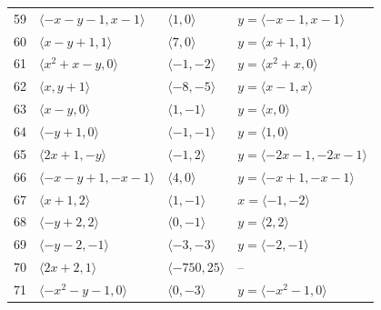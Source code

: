 \documentclass[11pt]{article}
\begin{document}
\begin{longtable}{@{}rlll@{}}
59 & $\langle -x-y-1,x-1\rangle$ & $\langle 1,0\rangle$ & $y=\langle -x-1,x-1\rangle$\\
60 & $\langle x-y+1,1\rangle$ & $\langle 7,0\rangle$ & $y=\langle x+1,1\rangle$\\
61 & $\langle x^{2}+x-y,0\rangle$ & $\langle -1,-2\rangle$ & $y=\langle x^{2}+x,0\rangle$\\
62 & $\langle x,y+1\rangle$ & $\langle -8,-5\rangle$ & $y=\langle x-1,x\rangle$\\
63 & $\langle x-y,0\rangle$ & $\langle 1,-1\rangle$ & $y=\langle x,0\rangle$\\
64 & $\langle -y+1,0\rangle$ & $\langle -1,-1\rangle$ & $y=\langle 1,0\rangle$\\
65 & $\langle 2x+1,-y\rangle$ & $\langle -1,2\rangle$ & $y=\langle -2x-1,-2x-1\rangle$\\
66 & $\langle -x-y+1,-x-1\rangle$ & $\langle 4,0\rangle$ & $y=\langle -x+1,-x-1\rangle$\\
67 & $\langle x+1,2\rangle$ & $\langle 1,-1\rangle$ & $x=\langle -1,-2\rangle$\\
68 & $\langle -y+2,2\rangle$ & $\langle 0,-1\rangle$ & $y=\langle 2,2\rangle$\\
69 & $\langle -y-2,-1\rangle$ & $\langle -3,-3\rangle$ & $y=\langle -2,-1\rangle$\\
70 & $\langle 2x+2,1\rangle$ & $\langle -750,25\rangle$ & --\\
71 & $\langle -x^{2}-y-1,0\rangle$ & $\langle 0,-3\rangle$ & $y=\langle -x^{2}-1,0\rangle$\\
\end{longtable}
\endgroup
\end{document}
